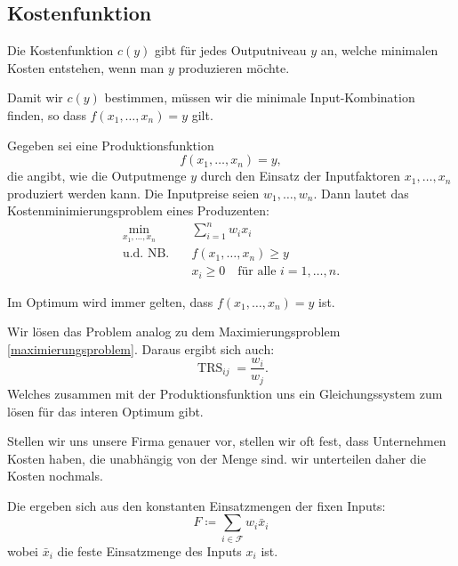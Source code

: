 \subsection{Kostenfunktion}

\begin{definition}
	Die Kostenfunktion $c(y)$ gibt für jedes Outputniveau $y$ an, welche
	minimalen Kosten entstehen, wenn man $y$ produzieren möchte.
\end{definition}
Damit wir $c(y)$ bestimmen, müssen wir die minimale Input-Kombination finden, so dass $f(x_1,\dotsc,x_n) =y$ gilt.

\begin{construction}[Kostenminimierungsproblem]
	Gegeben sei eine Produktionsfunktion
	\[
		f(x_1, \dots, x_n) = y,
	\]
	die angibt, wie die Outputmenge \( y \) durch den Einsatz der Inputfaktoren \( x_1, \dots, x_n \) produziert werden kann.
	Die Inputpreise seien \( w_1, \dots, w_n \). Dann lautet das Kostenminimierungsproblem eines Produzenten:
	\[
		\begin{aligned}
			\min_{x_1, \dots, x_n} \quad & \sum_{i=1}^{n} w_i x_i                             \\
			\text{u.d. NB.} \quad        & f(x_1, \dots, x_n) \geq y                          \\
			                             & x_i \geq 0 \quad \text{für alle } i = 1, \dots, n.
		\end{aligned}
	\]
\end{construction}
\begin{remark}
	Im Optimum wird immer gelten, dass $f(x_1,\dotsc,x_n) = y$ ist.
\end{remark}
Wir lösen das Problem analog zu dem Maximierungsproblem \ref{maximierungsproblem}. Daraus ergibt sich auch:
\[
	\operatorname{TRS}_{ij} = \frac{w_i}{w_j}
	.\]
Welches zusammen mit der Produktionsfunktion uns ein Gleichungssystem zum lösen für das interen Optimum gibt.

Stellen wir uns unsere Firma genauer vor, stellen wir oft fest, dass Unternehmen Kosten haben, die unabhängig von der Menge sind. wir unterteilen daher die Kosten nochmals.

\begin{definition} 
	Die  ergeben sich aus den konstanten Einsatzmengen der fixen Inputs:
	\[
		F \coloneqq \sum_{i \in \mathcal{F}} w_i \bar{x}_i
	\]
	wobei \( \bar{x}_i \) die feste Einsatzmenge des Inputs \( x_i \) ist.
\end{definition}

